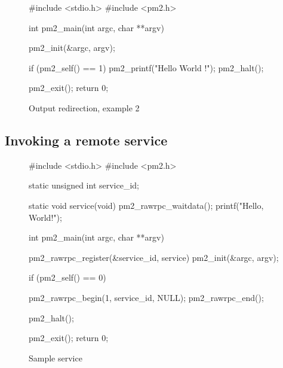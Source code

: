 \documentclass[a4paper,11pt]{report}
\begin{document}
\begin{figure}[p]
\begin{center}
\begin{boxedminipage}{0.8\textwidth}
\begin{footnotesize}
\begin{listing}{0}
 #include <stdio.h>
 #include <pm2.h>

 int pm2_main(int argc, char **argv)
 {
   pm2_init(&argc, argv);

   if (pm2_self() == 1)
     {
       pm2_printf("Hello World !\n");    
       pm2_halt();
     }
  
   pm2_exit();
   return 0;
 }
\end{listing}
\end{footnotesize}
\end{boxedminipage}
\end{center}
\caption{Output redirection, example 2\label{fig:ex2-2}}
\end{figure}

\afterpage{\clearpage}

\subsection{Invoking a remote service}

\begin{figure}[p]
\begin{center}
\begin{boxedminipage}{0.8\textwidth}
\begin{footnotesize}
\begin{listing}{0}
 #include <stdio.h>
 #include <pm2.h>

 static unsigned int service_id;

 static void service(void)
 {
   pm2_rawrpc_waitdata();
   printf("Hello, World!\n");
 }

 int pm2_main(int argc, char **argv)
 {
   pm2_rawrpc_register(&service_id, service)
   pm2_init(&argc, argv);

   if (pm2_self() == 0)
     {
       pm2_rawrpc_begin(1, service_id, NULL);
       pm2_rawrpc_end();

       pm2_halt();
     }
   pm2_exit();
   return 0;
 }
\end{listing}
\end{footnotesize}
\end{boxedminipage}
\end{center}
\caption{Sample service\label{fig:ex3}}
\end{figure}
\end{document}
